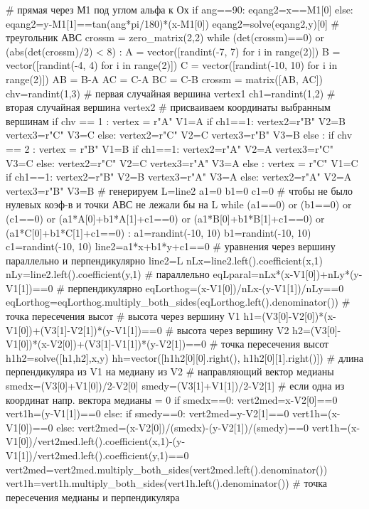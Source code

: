 \documentclass[a4paper, 12pt]{article}
\begin{document}
\begin{sagesilent}
#  прямая через М1 под углом альфа к Ох
if ang==90:
   eqang2=x==M1[0]
else:
   eqang2=y-M1[1]==tan(ang*pi/180)*(x-M1[0])
   eqang2=solve(eqang2,y)[0]
# треугольник АВС
crossm = zero_matrix(2,2)
while (det(crossm)==0) or (abs(det(crossm)/2) < 8) : 
  A = vector([randint(-7, 7) for i in range(2)])
  B = vector([randint(-4, 4) for i in range(2)])
  C = vector([randint(-10, 10) for i in range(2)])
  AB = B-A
  AC = C-A
  BC = C-B
  crossm = matrix([AB, AC])
chv=randint(1,3) # первая случайная вершина vertex1
ch1=randint(1,2) # вторая случайная вершина vertex2
# присваиваем координаты выбранным вершинам
if chv == 1 :
 vertex = r"A"
 V1=A
 if ch1==1:
  vertex2=r"B"
  V2=B
  vertex3=r"C"
  V3=C
 else: 
  vertex2=r"C"
  V2=C
  vertex3=r"B"
  V3=B
else :
 if chv == 2 :
  vertex = r"B"
  V1=B
  if ch1==1:
   vertex2=r"A"
   V2=A
   vertex3=r"C"
   V3=C
  else: 
   vertex2=r"C"
   V2=C
   vertex3=r"A"
   V3=A
 else :
  vertex = r"C"
  V1=C
  if ch1==1:
   vertex2=r"B"
   V2=B
   vertex3=r"A"
   V3=A
  else: 
   vertex2=r"A"
   V2=A
   vertex3=r"B"
   V3=B
# генерируем L=line2
a1=0
b1=0
c1=0
# чтобы не было нулевых коэф-в и точки АВС не лежали бы на L
while (a1==0) or (b1==0) or (c1==0) or (a1*A[0]+b1*A[1]+c1==0) or (a1*B[0]+b1*B[1]+c1==0) or (a1*C[0]+b1*C[1]+c1==0) :
 a1=randint(-10, 10)
 b1=randint(-10, 10)
 c1=randint(-10, 10)
 line2=a1*x+b1*y+c1==0
# уравнения через вершину параллельно и перпендикулярно line2=L
nLx=line2.left().coefficient(x,1)
nLy=line2.left().coefficient(y,1)
# параллельно
eqLparal=nLx*(x-V1[0])+nLy*(y-V1[1])==0
# перпендикулярно
eqLorthog=(x-V1[0])/nLx-(y-V1[1])/nLy==0
eqLorthog=eqLorthog.multiply_both_sides(eqLorthog.left().denominator())
# точка пересечения высот
# высота через вершину V1
h1=(V3[0]-V2[0])*(x-V1[0])+(V3[1]-V2[1])*(y-V1[1])==0
# высота через вершину V2
h2=(V3[0]-V1[0])*(x-V2[0])+(V3[1]-V1[1])*(y-V2[1])==0
# точка пересечения высот
h1h2=solve([h1,h2],x,y)
hh=vector([h1h2[0][0].right(), h1h2[0][1].right()])
# длина перпендикуляра из V1 на медиану из V2
# направляющий вектор медианы
smedx=(V3[0]+V1[0])/2-V2[0]
smedy=(V3[1]+V1[1])/2-V2[1]
# если одна из координат напр. вектора медианы = 0
if smedx==0:
 vert2med=x-V2[0]==0
 vert1h=(y-V1[1])==0
else:
 if smedy==0:
  vert2med=y-V2[1]==0
  vert1h=(x-V1[0])==0
 else:
  vert2med=(x-V2[0])/(smedx)-(y-V2[1])/(smedy)==0
  vert1h=(x-V1[0])/vert2med.left().coefficient(x,1)-(y-V1[1])/vert2med.left().coefficient(y,1)==0
vert2med=vert2med.multiply_both_sides(vert2med.left().denominator())
vert1h=vert1h.multiply_both_sides(vert1h.left().denominator())
# точка пересечения медианы и перпендикуляра

\end{sagesilent}
\end{document}
